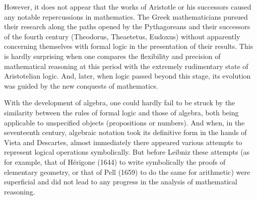 However, it does not appear that the works of Aristotle or his successors caused any notable repercussions in mathematics. The Greek mathematicians pursued their research along the paths opened by the Pythagoreans and their successors of the fourth century (Theodorus, Theaetetus, Eudoxus) without apparently concerning themselves with formal logic in the presentation of their results. This is hardly surprising when one compares the flexibility and precision of mathematical reasoning at this period with the extremely rudimentary state of Aristotelian logic. And, later, when logic passed beyond this stage, its evolution was guided by the new conquests of mathematics.

With the development of algebra, one could hardly fail to be struck by the similarity between the rules of formal logic and those of algebra, both being applicable to unspecified objects (propositions or numbers). And when, in the seventeenth century, algebraic notation took its definitive form in the hands of Vieta and Descartes, almost immediately there appeared various attempts to represent logical operations symbolically. But before Leibniz these attempts (as for example, that of Hérigone (1644) to write symbolically the proofs of elementary geometry, or that of Pell (1659) to do the same for arithmetic) were superficial and did not lead to any progress in the analysis of mathematical reasoning.

